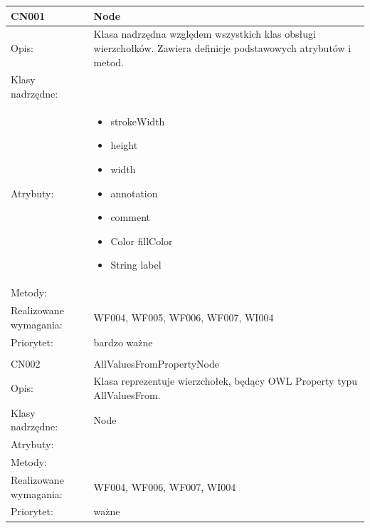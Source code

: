 \documentclass[a4paper,10pt]{article}
\begin{document}
\begin{center}
 


\begin{longtable}{|m{3cm}|m{9cm}|} \hline

CN001 & Node \\ \hline
Opis: & Klasa nadrzędna względem wszystkich klas obsługi wierzchołków. Zawiera definicje podstawowych atrybutów i metod.    \\ \hline
Klasy nadrzędne: &     \\ \hline
Atrybuty: & \begin{itemize}
 \item strokeWidth
 \item height
 \item width
 \item annotation
 \item comment
\item Color fillColor
\item String label
\end{itemize}
 \\ \hline
Metody: &%
  \\ \hline
Realizowane wymagania: & WF004, WF005, WF006, WF007, WI004 \\ \hline
Priorytet: & bardzo ważne  \\ \hline

\multicolumn{2}{c}{} \\
 \hline

CN002 & AllValuesFromPropertyNode \\ \hline
Opis: & Klasa reprezentuje wierzchołek, będący OWL Property typu AllValuesFrom.    \\ \hline
Klasy nadrzędne: & Node     \\ \hline
Atrybuty: & 
 \\ \hline
Metody: & %
  \\ \hline
Realizowane wymagania: & WF004, WF006, WF007, WI004 \\ \hline
Priorytet: & ważne \\ \hline


\end{longtable}
\end{center}
\end{document}
